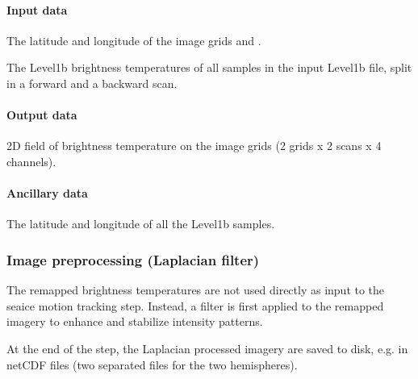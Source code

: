 \documentclass[letterpaper,10pt,english]{jupyterBook}
\begin{document}
\paragraph{Input data}
\label{\detokenize{baseline_algorithm_definition:id1}}
\sphinxAtStartPar
The latitude and longitude of the image grids  and .

\sphinxAtStartPar
The Level\sphinxhyphen{}1b brightness temperatures of all samples in the input Level\sphinxhyphen{}1b file, split in a forward and a backward scan.


\paragraph{Output data}
\label{\detokenize{baseline_algorithm_definition:id2}}
 2D field of brightness temperature on the image grids (2 grids x 2 scans x 4 channels).


\paragraph{Ancillary data}
\label{\detokenize{baseline_algorithm_definition:ancillary-data}}
\sphinxAtStartPar
The latitude and longitude of all the Level\sphinxhyphen{}1b samples.


\subsubsection{Image preprocessing (Laplacian filter)}
\label{\detokenize{baseline_algorithm_definition:image-preprocessing-laplacian-filter}}
\sphinxAtStartPar
The remapped brightness temperatures are not used directly as input to the sea\sphinxhyphen{}ice motion tracking step. Instead, a filter is first applied to the remapped imagery to
enhance and stabilize intensity patterns.

\sphinxAtStartPar
At the end of the step, the Laplacian processed imagery are saved to disk, e.g. in netCDF files (two separated files for the two hemispheres).
\end{document}
